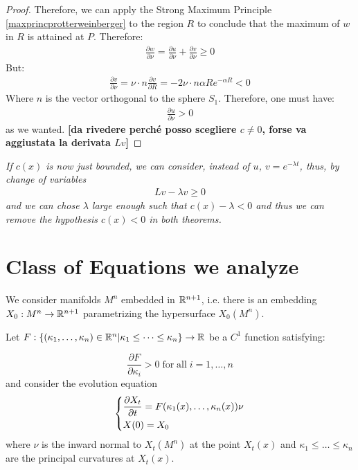 \begin{proof}
	Therefore, we can apply the Strong Maximum Principle \ref{maxprincprotterweinberger} to the region $R$ to conclude that the maximum of $w$ in $R$ is attained at $P$. Therefore:
	\begin{align*}
		\frac{\partial w}{\partial \nu}=\frac{\partial u}{\partial \nu}+\frac{\partial v}{\partial \nu}\geq0
	\end{align*}
	But:
	\begin{align*}
		\frac{\partial v}{\partial \nu}=\nu \cdot n\frac{\partial v}{\partial R} = - 2\nu \cdot n \alpha Re^{-\alpha R}<0
	\end{align*}
	Where $n$ is the vector orthogonal to the sphere $S_1$. Therefore, one must have:  
	\begin{align*}
		\frac{\partial u}{\partial \nu}>0
	\end{align*}
	as we wanted.
{\vspace{10pt}\LARGE \bf [da rivedere perché posso scegliere $c\neq0$, forse va aggiustata la derivata $Lv$]}
\end{proof}
\begin{oss}
	\em If $c(x)$ is now just bounded, we can consider, instead of $u$, $v=e^{-\lambda t}$, thus, by change of variables 
	\begin{align*}
		Lv-\lambda v \geq 0
	\end{align*}
	and we can chose $\lambda$ large enough such that $c(x)-\lambda<0$ and thus we can remove the hypothesis $c(x)<0$ in both theorems. 
\end{oss}


\section{Class of Equations we analyze}

We consider manifolds $M^n$ embedded in $\mathbb{R}^{n+1}$, i.e. there is an embedding $X_0 : M^n \rightarrow \mathbb{R}^{n+1}$ parametrizing the hypersurface $X_0(M^n)$. 

Let $F:\{(\kappa_1, \dots , \kappa_n)\in \mathbb{R}^n\vert \kappa_1\leq \dots \leq \kappa_n\}\rightarrow \mathbb{R}$ be a $C^1$ function satisfying:

\begin{equation}
	\frac{\partial F}{\partial \kappa_i} > 0 \mathrm{\; for \; all } \; i=1,\dots, n \label{parabolicità}
\end{equation}
and consider the evolution equation 
\begin{align}
	\begin{dcases}
		\frac{\partial X_t}{\partial t} = F(\kappa_1(x), \dots , \kappa_n(x)) \nu\\
		X(0)= X_0
	\end{dcases} \label{evolutioneq}
\end{align}
where $\nu$ is the inward normal to $X_t(M^n)$ at the point $X_t(x)$ and $\kappa_1\leq \dots \leq \kappa_n$ are the principal curvatures at $X_t(x)$. 


